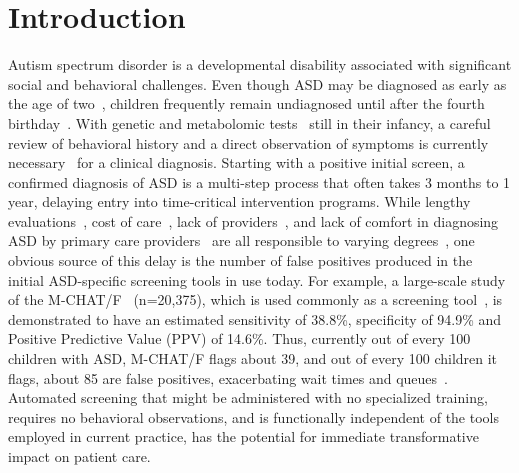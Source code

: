 \documentclass[onecolumn,10pt]{IEEEtran}
\begin{document}
\section*{Introduction}
% 
Autism spectrum disorder is a developmental disability associated with significant social  and behavioral challenges.
Even though ASD may be diagnosed as early as the  age of two~\cite{cdc},  children frequently remain undiagnosed  until after the fourth birthday~\cite{pmid24529515}. With genetic and metabolomic tests~\cite{howsmon2017classification,li2018high,hicks2018validation,smith2020metabolomics} still in their infancy,  a careful review of behavioral history and a direct
observation of symptoms is currently
necessary~\cite{volkmar2014practice,hyman2020identification} for a clinical diagnosis.  Starting with a positive initial screen, a confirmed diagnosis of ASD is a   multi-step process that often takes 3 months to 1 year,  delaying entry into time-critical intervention programs. While   lengthy evaluations~\cite{kalb2012determinants}, cost of care~\cite{bisgaier2011access},  lack of providers~\cite{fenikile2015barriers}, and lack of comfort in diagnosing ASD by primary care providers~\cite{fenikile2015barriers} are all responsible to varying degrees~\cite{gordon2016whittling}, one  obvious source of this delay is the number of false positives produced in the initial ASD-specific screening tools in use today. For example, a large-scale study of the  M-CHAT/F~\cite{pmid31562252} (n=20,375), which is  used commonly as a screening tool~\cite{robins2014validation,hyman2020identification},  is demonstrated to have an estimated  sensitivity of 38.8\%, specificity of 94.9\% and Positive Predictive Value (PPV) of 14.6\%. Thus,  currently  out of every 100 children with ASD,  M-CHAT/F flags about 39, and out of every 100 children it flags, about 85 are false positives, exacerbating  wait times and queues~\cite{gordon2016whittling}.  Automated   screening  that might be administered with  no specialized training, requires no behavioral observations, and is functionally independent of the tools employed in current practice,  has the potential for  immediate transformative  impact on patient care.
\end{document}
